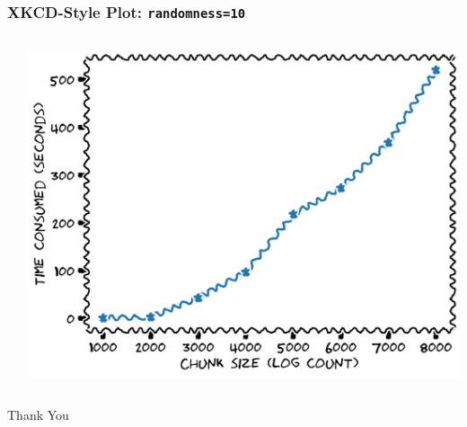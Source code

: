 \documentclass[xcolor={svgnames}]{beamer}
\newcommand{\pyfile}[2][]{}
\begin{document}
\begin{frame}[t,fragile]
    \frametitle{XKCD-Style Plot: \texttt{randomness=10}}
    \vspace{-2mm}
    \begin{columns}[T]
        \begin{column}{0.49\textwidth}
            \pyfile[style=footnotesize]{examples/xkcd-8.py}
        \end{column}
        \begin{column}{0.51\textwidth}
            \includegraphics[width=\textwidth]{img/xkcd-8.png}
        \end{column}
    \end{columns}
\end{frame}


\begin{frame}
    \Huge
    \centering

    Thank You
\end{frame}
\end{document}
